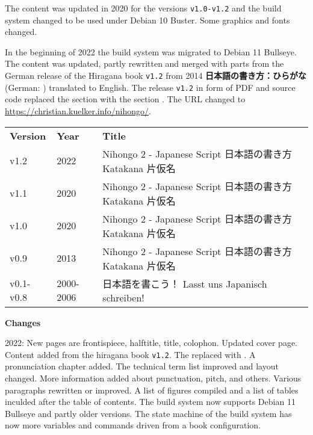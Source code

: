 \begin{flushleft}
{The content was updated in 2020 for the versions \texttt{v1.0-v1.2} and the
build system changed to be used under Debian 10 Buster. Some graphics and fonts
changed. \medskip

In the beginning of 2022 the build system was migrated to Debian 11 Bullseye.
The content was updated, partly rewritten and merged with parts from the German
release of the Hiragana book \texttt{v1.2} from 2014
\textbf{日本語の書き方：ひらがな} (German: \textit{}) translated to English.  The release \texttt{v1.2} in form of PDF and
source code replaced the \textit{} section  with
the section \textit{}.  The URL changed to
\url{https://christian.kuelker.info/nihongo/}.

}
\medskip

\begin{center}
\footnotesize
\begin{tabular}{lll}
\textbf{Version}&\textbf{Year}&\textbf{Title}\\
v1.2&2022&Nihongo 2 - Japanese Script 日本語の書き方 Katakana 片仮名\\
v1.1&2020&Nihongo 2 - Japanese Script 日本語の書き方 Katakana 片仮名\\
v1.0&2020&Nihongo 2 - Japanese Script 日本語の書き方 Katakana 片仮名\\
v0.9&2013&Nihongo 2 - Japanese Script 日本語の書き方 Katakana 片仮名\\
v0.1-v0.8&2000-2006&日本語を書こう！ Lasst uns Japanisch schreiben!\\
\end{tabular}
\end{center}

\fontsize{12pt}{12pt}\selectfont\sffamily
\textbf{Changes}

{
  \jfontsizenine

  \begin{description}

    \jfontsizenine
    \setlength{\itemsep}{0pt}%
    \setlength{\parskip}{0pt}%

    \item[\jfontsizenine\texttt{v1.2}]\jfontsizenine

      2022: New pages are frontispiece, halftitle, title, colophon. Updated
      cover page. Content added from the hiragana book \texttt{v1.2}. The
      \textit{} replaced with
      \textit{}. A pronunciation chapter added.
      The technical term list improved and layout changed. More information
      added about punctuation, pitch, and others. Various paragraphs rewritten
      or improved. A list of figures compiled and a list of tables  inculded
      after the table of contents. The build system now supports Debian 11
      Bullseye and partly older versions. The state machine of the build system
      has now more variables and commands driven from a book configuration.


\end{description}}
\end{flushleft}
